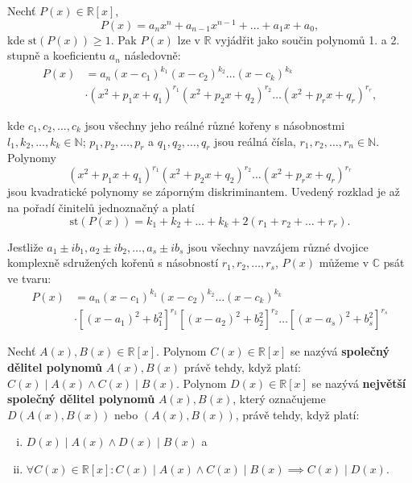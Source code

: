 \begin{veta}
  Nechť $P(x) \in \mathbb R [x]$,
  $$P(x) = a_n x^n + a_{n-1} x^{n-1} + \dots + a_1 x + a_0,$$
  kde $\textrm{st}(P(x)) \geq 1$. Pak $P(x)$ lze v $\mathbb R$ vyjádřit jako součin polynomů 1. a 2. stupně a koeficientu $a_n$ následovně:
  \begin{align*}
    P(x) & = a_n(x-c_1)^{k_1}(x-c_2)^{k_2} \dots (x-c_k)^{k_k}\\
    & \cdot (x^2+p_1 x + q_1)^{r_1}(x^2+p_2 x + q_2)^{r_2} \dots (x^2+p_r x + q_r)^{r_r},
  \end{align*}


  kde $c_1,c_2, \dots, c_k$ jsou všechny jeho reálné různé kořeny s násobnostmi $l_1, k_2, \dots, k_k \in \mathbb N$;
  $p_1, p_2, \dots, p_r$ a $q_1, q_2, \dots, q_r$ jsou reálná čísla, $r_1, r_2, \dots, r_n \in \mathbb N$.
  Polynomy
  $$(x^2+p_1 x + q_1)^{r_1}(x^2+p_2 x + q_2)^{r_2} \dots (x^2+p_r x + q_r)^{r_r}$$
  jsou kvadratické polynomy se záporným diskriminantem. Uvedený rozklad je až na pořadí činitelů
  jednoznačný a platí
  $$\textrm{st}(P(x)) = k_1 + k_2 + \dots + k_k + 2(r_1 + r_2 + \dots + r_r).$$

  Jestliže $a_1 \pm ib_1, a_2 \pm ib_2, \dots, a_s \pm ib_s$ jsou všechny navzájem různé
  dvojice komplexně sdružených kořenů s násobností $r_1, r_2, \dots, r_s$, $P(x)$ můžeme v $\mathbb C$ psát ve tvaru:
  \begin{align*}
    P(x) & = a_n(x-c_1)^{k_1}(x-c_2)^{k_2} \dots (x-c_k)^{k_k}\\
    & \cdot  \left [(x-a_1)^2+b_1^2\right ]^{r_1}\left [(x-a_2)^2+b_2^2\right]^{r_2} \dots \left [(x-a_s)^2+b_s^2\right ]^{r_s}
  \end{align*}
\end{veta}

\begin{definition}
  Nechť $A(x), B(x) \in \mathbb R [x]$. Polynom $C(x) \in \mathbb R [x]$ se nazývá \textbf{společný dělitel polynomů} $A(x), B(x)$
  právě tehdy, když platí: $C(x) \mid A(x) \land C(x) \mid B(x)$.
  Polynom $D(x) \in \mathbb R [x]$ se nazývá \textbf{největší společný dělitel polynomů} $A(x), B(x)$, který označujeme $D(A(x), B(x))$ nebo $(A(x), B(x))$, právě tehdy, když platí:
  \begin{enumerate}[i.]
    \item $D(x) \mid A(x) \land D(x) \mid B(x)$ a
    \item $\forall C(x) \in \mathbb R [x]: C(x) \mid A(x) \land C(x) \mid B(x) \implies C(x) \mid D(x).$
  \end{enumerate}
\end{definition}

